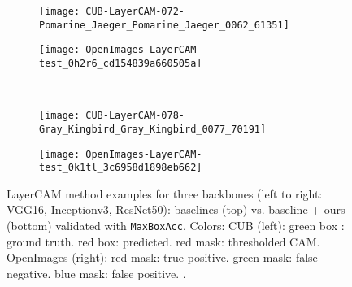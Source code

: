 \documentclass[twocolumn]{article}
\newcommand\maxboxacc{\texttt{MaxBoxAcc}\xspace}
\theoremstyle{definition}
\begin{document}
\begin{figure*}
\begin{subfigure}[b]{0.49\textwidth}
         \texttt{[image: CUB-LayerCAM-072-Pomarine\_Jaeger\_Pomarine\_Jaeger\_0062\_61351]}
     \end{subfigure}
     \hfill
     \begin{subfigure}[b]{0.49\textwidth}
         \centering
         \texttt{[image: OpenImages-LayerCAM-test\_0h2r6\_cd154839a660505a]}
     \end{subfigure}
     \\
     \vspace{0.1cm}
     \begin{subfigure}[b]{0.49\textwidth}
         \centering
         \texttt{[image: CUB-LayerCAM-078-Gray\_Kingbird\_Gray\_Kingbird\_0077\_70191]}
     \end{subfigure}
     \hfill
     \begin{subfigure}[b]{0.49\textwidth}
         \centering
         \texttt{[image: OpenImages-LayerCAM-test\_0k1tl\_3c6958d1898eb662]}
     \end{subfigure}
        \caption{LayerCAM method examples for three backbones (left to right: VGG16, Inceptionv3, ResNet50): baselines (top) vs. baseline + ours (bottom)  validated with \maxboxacc. Colors: CUB (left): green box : ground truth. red box: predicted. red mask: thresholded CAM. OpenImages (right): red mask: true positive. green mask: false negative. blue mask: false positive. .}
        \label{fig:layercam-cub-openim-example-pred}
\end{figure*}
\end{document}
